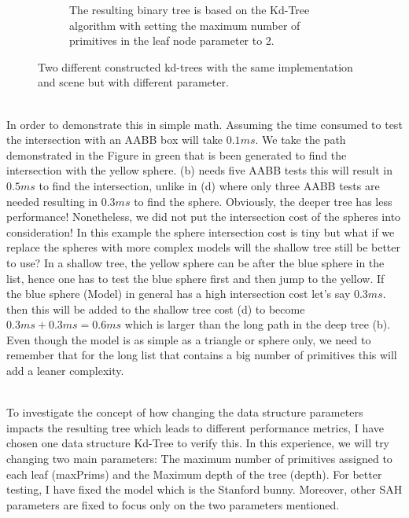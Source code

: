\documentclass[11pt,a4paper]{article}
\begin{document}
\begin{figure}[H]
\begin{subfigure}[b]{0.6\textwidth}
         \caption{The resulting binary tree is based on the Kd-Tree algorithm with setting the maximum number of primitives in the leaf node parameter to 2.
}
         \label{fig:pi_5000}
     \end{subfigure}
        \captionsetup{justification=centering,margin=2cm}
        \caption{Two different constructed kd-trees with the same implementation and scene but with different parameter.}
        \label{fig:three graphs}
\end{figure}

\noindent
\\
In order to demonstrate this in simple math. Assuming the time consumed to test the intersection with an AABB box will take $0.1ms$. We take the path demonstrated in the Figure in green that is been generated to find the intersection with the yellow sphere. (b) needs five AABB tests this will result in $0.5ms$ to find the intersection, unlike in (d) where only three AABB tests are needed resulting in $0.3ms$ to find the sphere. Obviously, the deeper tree has less performance! Nonetheless, we did not put the intersection cost of the spheres into consideration! In this example the sphere intersection cost is tiny but what if we replace the spheres with more complex models will the shallow tree still be better to use? In a shallow tree, the yellow sphere can be after the blue sphere in the list, hence one has to test the blue sphere first and then jump to the yellow. If the blue sphere (Model) in general has a high intersection cost let's say $0.3ms$. then this will be added to the shallow tree cost (d) to become $0.3ms + 0.3ms = 0.6ms$ which is larger than the long path in the deep tree (b). Even though the model is as simple as a triangle or sphere only, we need to remember that for the long list that contains a big number of primitives this will add a leaner complexity.

\noindent
\\
To investigate the concept of how changing the data structure parameters impacts the resulting tree which leads to different performance metrics, I have chosen one data structure Kd-Tree to verify this. In this experience, we will try changing two main parameters: The maximum number of primitives assigned to each leaf (maxPrims) and the Maximum depth of the tree (depth). For better testing, I have fixed the model which is the Stanford bunny. Moreover, other SAH parameters are fixed to focus only on the two parameters mentioned. 
\end{document}
